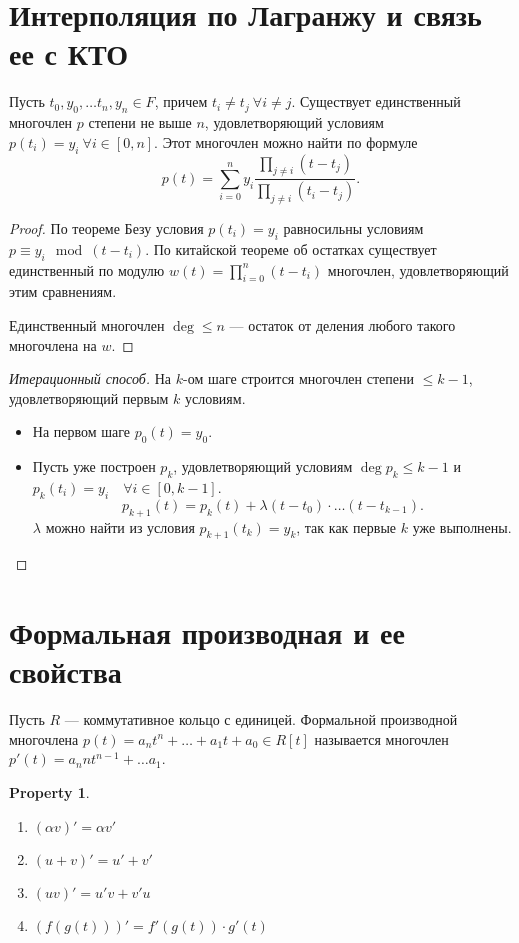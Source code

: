 \documentclass[11pt]{book}
\renewcommand{\le}{\leqslant}
\theoremstyle{definition}
\theoremstyle{plain}
\theoremstyle{plain}
\newtheorem*{prop}{Property}
\theoremstyle{definition}
\theoremstyle{remark}
\begin{document}
\section{Интерполяция по Лагранжу и связь ее с КТО}
\begin{thm}
    Пусть $ t_0, y_0, \ldots t_n, y_n \in F$, причем $ t_i \ne  t_j ~ \forall i \ne j$. Существует единственный многочлен $ p$ степени не выше  $ n$, удовлетворяющий условиям  $ p(t_i) = y_i ~ \forall i \in [0, n]$. Этот многочлен можно найти по формуле
    \[
	p(t) = \sum_{i = 0}^{n} y_i \frac{\prod_{j \ne  i}(t-t_j)}{\prod_{j \ne  i}(t_i - t_j)}
    .\]
\end{thm}
\begin{proof}
    По теореме Безу условия $ p(t_i) = y_i $  равносильны условиям  $ p \equiv y_{i} \mod (t - t_i)$. По китайской теореме об остатках существует единственный по модулю $ w(t) = \prod\limits_{i = 0}^{n}(t-t_i)$ многочлен, удовлетворяющий этим сравнениям.

    Единственный многочлен $ \deg \le n $ --- остаток от деления любого такого многочлена на $ w$.
\end{proof}
\begin{proof}[Итерационный способ]
    На $ k$-ом шаге строится многочлен степени  $ \le k-1$, удовлетворяющий первым $ k$ условиям.

    \begin{itemize}
	\item
	    На первом шаге  $ p_0(t) = y_0$.
	\item Пусть уже построен $ p_k$, удовлетворяющий условиям  $ \deg p_k \le k -1$ и $ p_k(t_i) = y_i \quad \forall i \in [0, k-1]$.
	    \[
		p_{k+1} (t) = p_k(t) + \lambda(t - t_0 ) \cdot  \ldots  (t - t_{k-1})
	    .\]
	    $ \lambda$ можно найти из условия  $ p_{k+1}(t_{k}) = y_k$, так как первые $ k$ уже выполнены.
    \end{itemize}

\end{proof}
\section{Формальная производная и ее свойства}
\begin{defn}
    Пусть $ R$ --- коммутативное кольцо с единицей. {\sf Формальной производной многочлена } $ p(t) = a_n t ^{n} + \ldots + a_1t+ a_0 \in R[t]$ называется многочлен $ p'(t) = a_n n t ^{n -1} + \ldots a_1$.
\end{defn}
\begin{prop}
    $ $
    \begin{enumerate}[noitemsep]
	\item  $ (\alpha v)' = \alpha  v' $
	\item  $ (u+ v)' = u'+  v' $
	\item $
	    (uv)' = u' v + v' u
	    $
	\item  $ \left( f(g(t)) \right) ' = f'(g(t)) \cdot g'(t)$
    \end{enumerate}
\end{prop}
\end{document}
